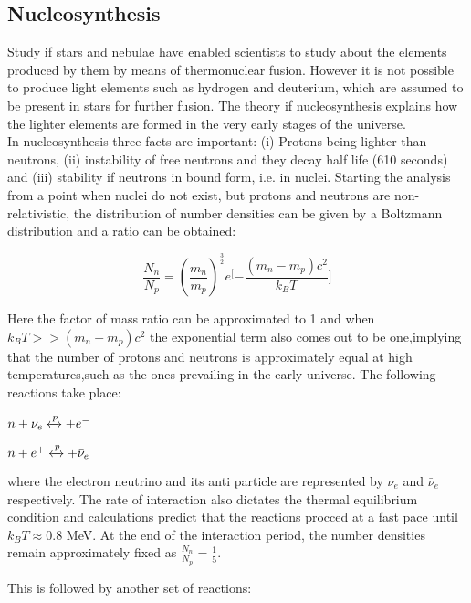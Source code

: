 \documentclass{article}
\begin{document}
\subsection{Nucleosynthesis}
Study if stars and nebulae have enabled scientists to study about the elements produced by them by means of thermonuclear fusion. However it is not possible to produce light elements such as hydrogen and deuterium, which are assumed to be present in stars for further fusion. The theory if nucleosynthesis explains how the lighter elements are formed in the very early stages of the universe.
\\
In nucleosynthesis three facts are important: (i) Protons being lighter than neutrons, (ii) instability of free neutrons and they decay half life (610 seconds) and (iii) stability if neutrons in bound form, i.e. in nuclei. Starting the analysis from a point when nuclei do not exist, but protons and neutrons are non-relativistic, the distribution of number densities can be given by a Boltzmann distribution and a ratio can be obtained:

\begin{equation}
    \frac{N_n}{N_p} = (\frac{m_n}{m_p})^{\frac{3}{2}}e^[{-\frac{(m_n-m_p)c^2}{k_{B}T}]}
\end{equation}

Here the factor of mass ratio can be approximated to 1 and when $k_{B}T >> (m_n-m_p)c^2$ the exponential term also comes out to be one,implying that the number of protons and neutrons is approximately equal at high temperatures,such as the ones prevailing in the early universe.
The following reactions take place:

\begin{center}
    $n + \nu_{e} \xleftrightarrow p + e^{-}$
\end{center}

\begin{center}
    $n + e^{+} \xleftrightarrow p + {\bar{\nu}_{e}}$
\end{center}

where the electron neutrino and its anti particle are represented by $\nu_{e}$ and ${\bar{\nu}_{e}}$ respectively. The rate of interaction also dictates the thermal equilibrium condition and calculations predict that the reactions procced at a fast pace until $k_{B}T \approx 0.8$ MeV. At the end of the interaction period, the number densities remain approximately fixed as $\frac{N_n}{N_p} = \frac{1}{5}$.

This is followed by another set of reactions: 
\end{document}

